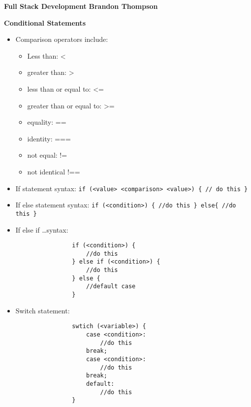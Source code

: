 \documentclass[12pt]{article}
\begin{document}
\noindent
\textbf{Full Stack Development} \hfill \textbf{Brandon Thompson} \\

\begin{center}
\textbf{Conditional Statements}
\end{center}
	\begin{itemize}
		\item Comparison operators include:
			\begin{itemize}
				\item Less than: \textless
				\item greater than: \textgreater
				\item less than or equal to: <=
				\item greater than or equal to: >=
				\item equality: == 
				\item identity: ===
				\item not equal: !=
				\item not identical !==
			\end{itemize}
		\item If statement syntax: \verb|if (<value> <comparison> <value>) { // do this }|
		\item If else statement syntax: \verb|if (<condition>) { //do this } else{ //do this }|
		\item If else if \ldots syntax:
			\begin{verbatim}
				if (<condition>) {
				    //do this
				} else if (<condition>) {
				    //do this
				} else {
				    //default case
				}
			\end{verbatim}
		\item Switch statement: 
			\begin{verbatim}
				swtich (<variable>) {
				    case <condition>:
				        //do this
					break;
				    case <condition>:
				        //do this
					break;
				    default:
				        //do this
				}
			\end{verbatim}
	\end{itemize}
	
\end{document}
